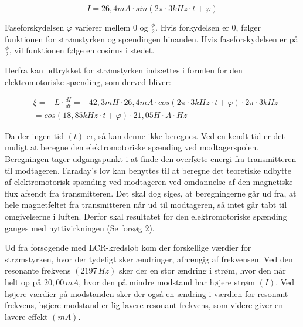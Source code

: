 \begin{equation}
I = 26,4 mA \cdot sin(2 \pi \cdot 3 kHz \cdot t + \varphi)
\end{equation}

Faseforskydelsen $\varphi$ varierer mellem 0 og $\frac{\phi}{2}$. Hvis forkydelsen er 0, følger funktionen for strømstyrken og spændingen hinanden. Hvis faseforskydelsen er på $\frac{\phi}{2}$, vil funktionen følge en cosinus i stedet.

Herfra kan udtrykket for strømstyrken indsættes i formlen for den elektromotoriske spænding, som derved bliver:

\begin{equation}
\begin{aligned}
&\xi = - L \cdot \frac{dI}{dt} = - 42,3 mH \cdot 26,4 mA \cdot cos(2 \pi \cdot 3 kHz \cdot t +\varphi) \cdot 2 \pi \cdot 3 kHz \\
&= cos(18,85 kHz \cdot t + \varphi) \cdot 21,05 H \cdot A \cdot Hz
\end{aligned}
\end{equation}

Da der ingen tid $(t)$ er, så kan denne ikke beregnes. Ved en kendt tid er det muligt at beregne den elektromotoriske spænding ved modtagerspolen. Beregningen tager udgangspunkt i at finde den overførte energi fra transmitteren til modtageren. Faraday's lov kan benyttes til at beregne det teoretiske udbytte af elektromotorisk spænding ved modtageren ved omdannelse af den magnetiske flux afsendt fra transmitteren. Det skal dog siges, at beregningerne går ud fra, at hele magnetfeltet fra transmitteren når ud til modtageren, så intet går tabt til omgivelserne i luften. Derfor skal resultatet for den elektromotoriske spænding ganges med nyttivirkningen (Se forsøg 2).

Ud fra forsøgende med LCR-kredsløb kom der forskellige værdier for strømstyrken, hvor der tydeligt sker ændringer, afhængig af frekvensen. Ved den resonante frekvens $(2197 \, Hz)$ sker der en stor ændring i strøm, hvor den når helt op på $20,00 \, mA$, hvor den på mindre modstand har højere strøm $(I)$. Ved højere værdier på modstanden sker der også en ændring i værdien for resonant frekvens, højere modstand er lig lavere resonant frekvens, som videre giver en lavere effekt $(mA)$.

\newpage
